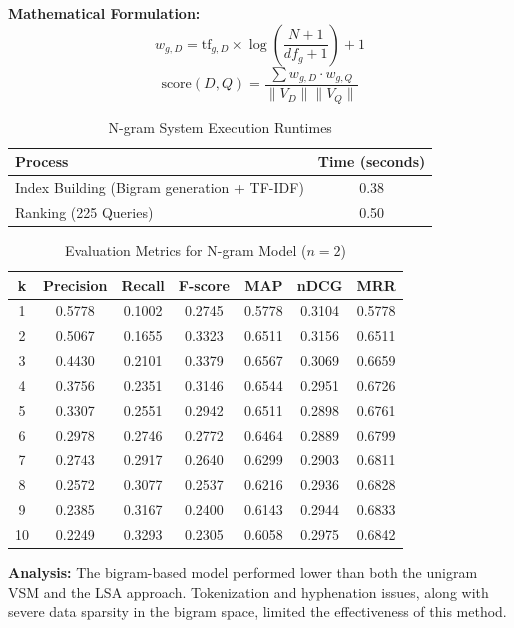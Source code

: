 \textbf{Mathematical Formulation:}
\[
w_{g,D} = \text{tf}_{g,D} \times \log\left(\frac{N+1}{df_g+1}\right) + 1
\]
\[
\text{score}(D, Q) = \frac{\sum w_{g,D} \cdot w_{g,Q}}{\|V_D\| \|V_Q\|}
\]

\begin{table}[H]
\centering
\begin{tabular}{|l|c|}
\hline
\textbf{Process} & \textbf{Time (seconds)} \\ \hline
Index Building (Bigram generation + TF-IDF) & 0.38 \\ \hline
Ranking (225 Queries) & 0.50 \\ \hline
\end{tabular}
\caption{N-gram System Execution Runtimes}
\end{table}

\begin{table}[H]
\centering
\small
\begin{tabular}{|c|ccc|ccc|}
\hline
\textbf{k} & \textbf{Precision} & \textbf{Recall} & \textbf{F-score} & \textbf{MAP} & \textbf{nDCG} & \textbf{MRR} \\ \hline
1  & 0.5778 & 0.1002 & 0.2745 & 0.5778 & 0.3104 & 0.5778 \\
2  & 0.5067 & 0.1655 & 0.3323 & 0.6511 & 0.3156 & 0.6511 \\
3  & 0.4430 & 0.2101 & 0.3379 & 0.6567 & 0.3069 & 0.6659 \\
4  & 0.3756 & 0.2351 & 0.3146 & 0.6544 & 0.2951 & 0.6726 \\
5  & 0.3307 & 0.2551 & 0.2942 & 0.6511 & 0.2898 & 0.6761 \\
6  & 0.2978 & 0.2746 & 0.2772 & 0.6464 & 0.2889 & 0.6799 \\
7  & 0.2743 & 0.2917 & 0.2640 & 0.6299 & 0.2903 & 0.6811 \\
8  & 0.2572 & 0.3077 & 0.2537 & 0.6216 & 0.2936 & 0.6828 \\
9  & 0.2385 & 0.3167 & 0.2400 & 0.6143 & 0.2944 & 0.6833 \\
10 & 0.2249 & 0.3293 & 0.2305 & 0.6058 & 0.2975 & 0.6842 \\ \hline
\end{tabular}
\caption{Evaluation Metrics for N-gram Model ($n=2$)}
\end{table}

\textbf{Analysis:}
The bigram-based model performed lower than both the unigram VSM and the LSA approach. Tokenization and hyphenation issues, along with severe data sparsity in the bigram space, limited the effectiveness of this method.

